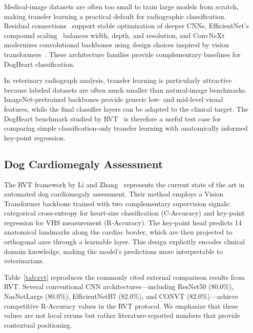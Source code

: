 \documentclass[10pt,twocolumn,letterpaper]{article}
\begin{document}
Medical-image datasets are often too small to train large models from scratch, making transfer learning a practical default for radiographic classification. Residual connections~\cite{resnet2016} support stable optimization of deeper CNNs, EfficientNet's compound scaling~\cite{efficientnet2019} balances width, depth, and resolution, and ConvNeXt modernizes convolutional backbones using design choices inspired by vision transformers~\cite{convnext2022}. These architecture families provide complementary baselines for DogHeart classification.

In veterinary radiograph analysis, transfer learning is particularly attractive because labeled datasets are often much smaller than natural-image benchmarks. ImageNet-pretrained backbones provide generic low- and mid-level visual features, while the final classifier layers can be adapted to the clinical target. The DogHeart benchmark studied by RVT~\cite{li2024regressive} is therefore a useful test case for comparing simple classification-only transfer learning with anatomically informed key-point regression.

\subsection{Dog Cardiomegaly Assessment}

The RVT framework by Li and Zhang~\cite{li2024regressive} represents the current state of the art in automated dog cardiomegaly assessment. Their method employs a Vision Transformer backbone trained with two complementary supervision signals: categorical cross-entropy for heart-size classification (C-Accuracy) and key-point regression for VHS measurement (R-Accuracy). The key-point head predicts 14 anatomical landmarks along the cardiac border, which are then projected to orthogonal axes through a learnable layer. This design explicitly encodes clinical domain knowledge, making the model's predictions more interpretable to veterinarians.

Table~\ref{tab:rvt} reproduces the commonly cited external comparison results from RVT. Several conventional CNN architectures---including ResNet50 (80.0\%), NasNetLarge (80.0\%), EfficientNetB7 (82.0\%), and CONVT (82.0\%)---achieve competitive R-Accuracy values in the RVT protocol. We emphasize that these values are not local reruns but rather literature-reported numbers that provide contextual positioning.
\end{document}
